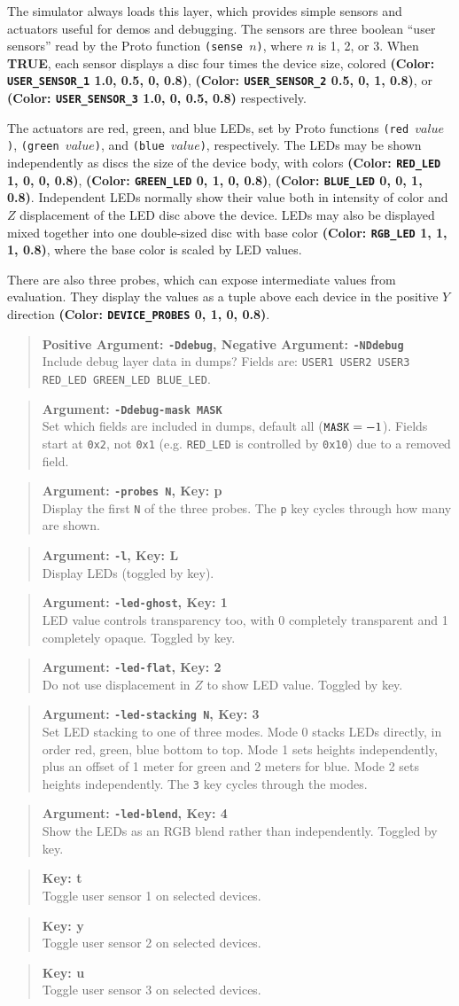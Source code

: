 \documentclass{article}
\newcommand\true{{\bf TRUE}}
\newcommand\var[1]{{\tt #1}}
\newcommand\key[1]{{\bf #1}}
\newcommand\simarg[2]{\begin{quote} {\bf Argument: \var{#1}} \\ #2 \end{quote}}
\newcommand\simkey[2]{\begin{quote} {\bf Key: \key{#1}} \\ #2 \end{quote}}
\newcommand\simargkey[3]{
  \begin{quote} {\bf Argument: \var{#1}, Key: \key{#2}} \\ #3 \end{quote}
}
\newcommand\simPMarg[3]{
  \begin{quote}
    {\bf Positive Argument: \var{#1}, Negative Argument: \var{#2}} \\ #3
  \end{quote}
}
\newcommand\color[5]{{\bf (Color: {\tt #1} #2, #3, #4, #5)}} %
\begin{document}
The simulator always loads this layer, which provides simple sensors
and actuators useful for demos and debugging.  The sensors are three
boolean ``user sensors'' read by the Proto function \var{(sense $n$)},
where $n$ is 1, 2, or 3.  When \true{}, each sensor displays a disc
four times the device size, colored
\color{USER\_SENSOR\_1}{1.0}{0.5}{0}{0.8},
\color{USER\_SENSOR\_2}{0.5}{0}{1}{0.8}, or
\color{USER\_SENSOR\_3}{1.0}{0}{0.5}{0.8} respectively.

The actuators are red, green, and blue LEDs, set by Proto functions
\var{(red $value$)}, \var{(green $value$)}, and \var{(blue $value$)},
respectively.  The LEDs may be shown independently as discs the size
of the device body, with colors \color{RED\_LED}{1}{0}{0}{0.8},
\color{GREEN\_LED}{0}{1}{0}{0.8}, \color{BLUE\_LED}{0}{0}{1}{0.8}.
Independent LEDs normally show their value both in intensity of color
and $Z$ displacement of the LED disc above the device.  LEDs may also
be displayed mixed together into one double-sized disc with base color
\color{RGB\_LED}{1}{1}{1}{0.8}, where the base color is scaled by LED
values.

There are also three probes, which can expose intermediate values from
evaluation.  They display the values as a tuple above each device in
the positive $Y$ direction \color{DEVICE\_PROBES}{0}{1}{0}{0.8}.

\simPMarg{-Ddebug}{-NDdebug}{Include debug layer data in dumps?
  Fields are: \var{USER1 USER2 USER3 RED\_LED GREEN\_LED BLUE\_LED}.}
\simarg{-Ddebug-mask MASK}{Set which fields are included in dumps,
  default all ($\var{MASK}=-1$).  Fields start at \var{0x2}, not
  \var{0x1} (e.g. \var{RED\_LED} is controlled by \var{0x10}) due to a
  removed field.}
\simargkey{-probes N}{p}{Display the first \var{N} of the three probes.  
  The \var{p} key cycles through how many are shown.}
\simargkey{-l}{L}{Display LEDs (toggled by key).}
\simargkey{-led-ghost}{1}{LED value controls transparency too, with 0
  completely transparent and 1 completely opaque.  Toggled by key.}
\simargkey{-led-flat}{2}{Do not use displacement in $Z$ to show LED value.
  Toggled by key.}
\simargkey{-led-stacking N}{3}{Set LED stacking to one of three modes.
  Mode 0 stacks LEDs directly, in order red, green, blue bottom to top. 
  Mode 1 sets heights independently, plus an offset of 1 meter for green 
  and 2 meters for blue.  Mode 2 sets heights independently.  The \var{3} key
  cycles through the modes.}
\simargkey{-led-blend}{4}{Show the LEDs as an RGB blend rather than 
  independently.  Toggled by key.}
\simkey{t}{Toggle user sensor 1 on selected devices.}
\simkey{y}{Toggle user sensor 2 on selected devices.}
\simkey{u}{Toggle user sensor 3 on selected devices.}
\end{document}
